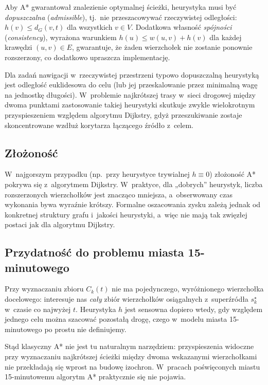 Aby A* gwarantował znalezienie optymalnej ścieżki, heurystyka musi być
\emph{dopuszczalna} (\emph{admissible}), tj.\ nie przeszacowywać
rzeczywistej odległości: $h(v)\le d_G(v,t)$ dla wszystkich $v\in V$.
Dodatkowa własność \emph{spójności} (\emph{consistency}), wyrażona warunkiem
$h(u)\le w(u,v)+h(v)$ dla każdej krawędzi $(u,v)\in E$, gwarantuje, że
żaden wierzchołek nie zostanie ponownie rozszerzony, co dodatkowo
upraszcza implementację.

Dla zadań nawigacji w~rzeczywistej przestrzeni typowo dopuszczalną
heurystyką jest odległość euklidesowa do celu (lub jej przeskalowanie
przez minimalną wagę na jednostkę długości). W~problemie najkrótszej
trasy w~sieci drogowej między dwoma punktami zastosowanie takiej
heurystyki skutkuje zwykle wielokrotnym przyspieszeniem względem
algorytmu Dijkstry, gdyż przeszukiwanie zostaje skoncentrowane wzdłuż
korytarza łączącego źródło z~celem.

\clearpage

\subsection{Złożoność}

W~najgorszym przypadku (np.\ przy heurystyce trywialnej $h\equiv 0$)
złożoność A* pokrywa się z~algorytmem Dijkstry. W~praktyce, dla
„dobrych” heurystyk, liczba rozszerzonych wierzchołków jest znacząco
mniejsza, a~obserwowany czas wykonania bywa wyraźnie krótszy. Formalne
oszacowania zysku zależą jednak od konkretnej struktury grafu i~jakości
heurystyki, a~więc nie mają tak zwięzłej postaci jak dla algorytmu
Dijkstry.

\subsection{Przydatność do problemu miasta 15-minutowego}

Przy wyznaczaniu zbioru $C_k(t)$ nie ma pojedynczego, wyróżnionego
wierzchołka docelowego: interesuje nas \emph{cały} zbiór wierzchołków
osiągalnych z~superźródła $s^\star_k$ w~czasie co najwyżej $t$.
Heurystyka $h$ jest sensowna dopiero wtedy, gdy względem jednego celu
można szacować pozostałą drogę, czego w~modelu miasta 15-minutowego po prostu
nie definiujemy.

Stąd klasyczny A* nie jest tu naturalnym narzędziem: przyspieszenia
widoczne przy wyznaczaniu najkrótszej ścieżki między dwoma wskazanymi
wierzchołkami nie przekładają się wprost na budowę izochron. W~pracach
poświęconych miastu 15-minutowemu algorytm A* praktycznie się nie pojawia.

